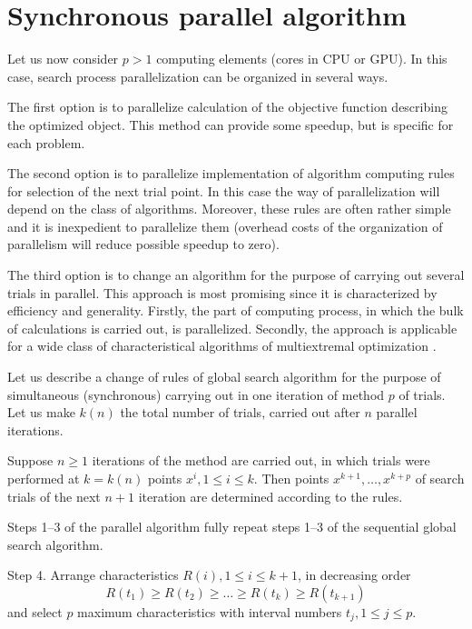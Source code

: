 \documentclass[smallcondensed]{svjour3}     %
\begin{document}
\section{Synchronous parallel algorithm} \label{sec:3}

Let us now consider $p>1$ computing elements (cores in CPU or GPU). In this case, search process parallelization can be organized in several ways.

The first option is to parallelize calculation of the objective function describing the optimized object. This method can provide some speedup, but is specific for each problem.

The second option is to parallelize implementation of algorithm computing rules for selection of the next trial point. In this case the way of parallelization will depend on the class of algorithms. Moreover, these rules are often rather simple and it is inexpedient to parallelize them (overhead costs of the organization of parallelism will reduce possible speedup to zero).

The third option is to change an algorithm for the purpose of carrying out several trials in parallel. This approach is most promising since it is characterized by efficiency and generality. Firstly, the part of computing process, in which the bulk of calculations is carried out, is parallelized. Secondly, the approach is applicable for a wide class of characteristical algorithms of multiextremal optimization \cite{RefGrishagin1997}.

Let us describe a change of rules of global search algorithm for the purpose of simultaneous (synchronous) carrying out in one iteration of method $p$ of trials. Let us make $k(n)$ the total number of trials, carried out after $n$ parallel iterations.

Suppose $n\geq 1$  iterations of the method are carried out, in which trials were performed at $k=k(n)$ points $x^i,1\leq i \leq k$. Then points $x^{k+1},\dots,x^{k+p}$  of search trials of the next $n+1$ iteration are determined according to the rules.

Steps 1--3 of the parallel algorithm fully repeat steps 1--3 of the sequential global search algorithm.

Step 4. Arrange characteristics  $R(i), 1 \leq i \leq k+1$, in decreasing order 
\begin{equation}\label{eq:21}
R(t_1)\geq R(t_2)\geq \dots \geq R(t_{k}) \geq R(t_{k+1})
\end{equation}
and select $p$ maximum characteristics with interval numbers $t_j, 1\leq j \leq p$.
\end{document}
